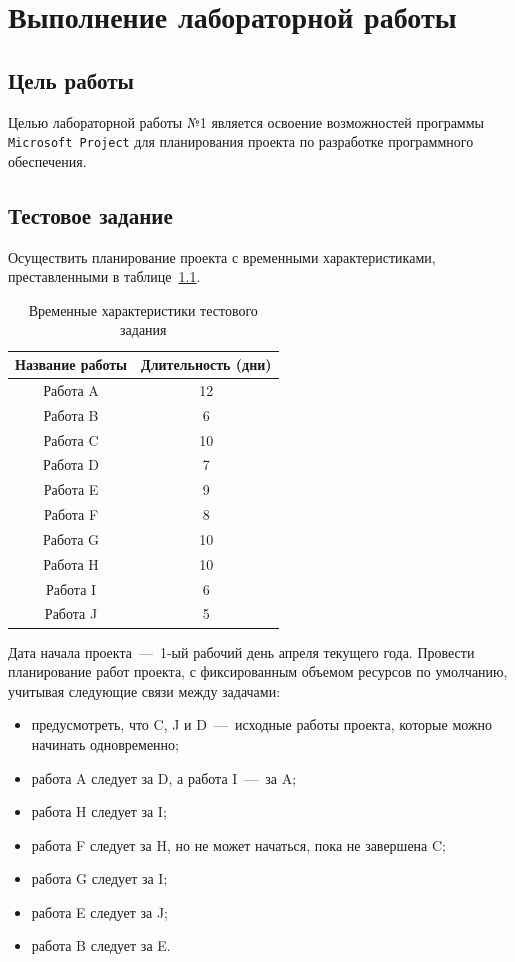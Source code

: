 \chapter{Выполнение лабораторной работы}

\section{Цель работы}

Целью лабораторной работы №1 является освоение возможностей программы \texttt{Microsoft Project} для планирования проекта по разработке программного обеспечения.

\section{Тестовое задание}

 Осуществить планирование проекта с временными характеристиками, преставленными в таблице~\ref{tab:tz1}.
\begin{table}[H]
\caption{Временные характеристики тестового задания}
\label{tab:tz1}
\centering
\begin{tabular}{|c|c|}\hline
	Название работы & Длительность (дни) \\
	\hline
	Работа A & 12\\
	\hline
	Работа B & 6 \\
	\hline
	Работа C & 10\\
	\hline
	Работа D & 7\\\hline
	Работа E & 9\\\hline
	Работа F & 8\\\hline
	Работа G & 10\\\hline
	Работа H & 10\\\hline
	Работа I & 6\\\hline
	Работа J & 5\\\hline
\end{tabular}
\end{table}

Дата начала проекта~---~1-ый рабочий день апреля текущего года. Провести планирование работ проекта, с фиксированным объемом ресурсов по умолчанию, учитывая следующие связи между задачами:
\begin{itemize}
	\item предусмотреть, что C, J и D~---~исходные работы проекта, которые можно начинать одновременно;
	\item работа A следует за D, а работа I~---~за A;
	\item работа H следует за I;
	\item работа F следует за H, но не может начаться, пока не завершена C;
	\item работа G следует за I;
	\item работа E следует за J;
	\item работа B следует за E.
\end{itemize}

